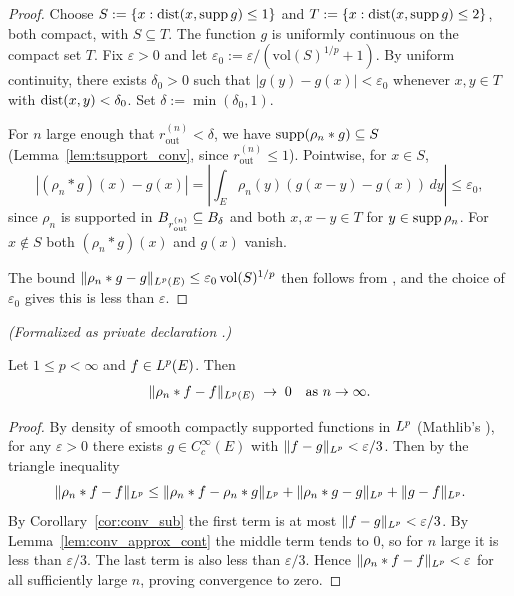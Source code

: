 \begin{proof}
\leanok
{}

Choose $S := \{x : \operatorname{dist}(x, \operatorname{supp} g) \le 1\}$ and $T := \{x : \operatorname{dist}(x, \operatorname{supp} g)
\le 2\}$, both compact, with $S \subseteq T$. The function $g$ is uniformly
continuous on the compact set $T$. Fix $\varepsilon > 0$ and let $\varepsilon_0
:= \varepsilon / (\mathrm{vol}(S)^{1/p} + 1)$. By uniform continuity, there
exists $\delta_0 > 0$ such that $|g(y) - g(x)| < \varepsilon_0$ whenever
$x, y \in T$ with $\operatorname{dist}(x, y) < \delta_0$. Set $\delta := \min(\delta_0, 1)$.

For $n$ large enough that $r_{\text{out}}^{(n)} < \delta$, we have $\operatorname{supp}(\rho_n
* g) \subseteq S$ (Lemma~\ref{lem:tsupport_conv}, since
$r_{\text{out}}^{(n)} \le 1$). Pointwise, for $x \in S$,
\begin{equation*}
  |(\rho_n * g)(x) - g(x)|
    = \left|\int_E \rho_n(y) (g(x - y) - g(x))\,dy\right|
    \le \varepsilon_0,
\end{equation*}
since $\rho_n$ is supported in $B_{r_{\text{out}}^{(n)}} \subseteq B_{\delta}$
and both $x, x - y \in T$ for $y \in \operatorname{supp}\rho_n$. For $x \notin S$ both
$(\rho_n * g)(x)$ and $g(x)$ vanish.

The bound $\|\rho_n * g - g\|_{L^{p}(E)} \le \varepsilon_0
\,\mathrm{vol}(S)^{1/p}$ then follows from
, and the choice of $\varepsilon_0$
gives this is less than $\varepsilon$.
\end{proof}

\begin{theorem}
\label{thm:conv_approx_Lp}
\leanok
\noindent\textit{(Formalized as private declaration .)}\par
Let $1 \le p < \infty$ and $f \in L^{p}(E)$. Then
\begin{equation*}
  \|\rho_n * f - f\|_{L^{p}(E)} \;\to\; 0 \quad\text{as } n \to \infty.
\end{equation*}
\end{theorem}

\begin{proof}
\leanok
{}

By density of smooth compactly supported functions in $L^{p}$ (Mathlib's
), for any $\varepsilon > 0$ there
exists $g \in C_c^\infty(E)$ with $\|f - g\|_{L^{p}} < \varepsilon/3$. Then by
the triangle inequality
\begin{equation*}
  \|\rho_n * f - f\|_{L^{p}} \le
  \|\rho_n * f - \rho_n * g\|_{L^{p}} + \|\rho_n * g - g\|_{L^{p}} +
  \|g - f\|_{L^{p}}.
\end{equation*}
By Corollary~\ref{cor:conv_sub} the first term is at most $\|f - g\|_{L^{p}} <
\varepsilon/3$. By Lemma~\ref{lem:conv_approx_cont} the middle term tends to
$0$, so for $n$ large it is less than $\varepsilon/3$. The last term is also
less than $\varepsilon/3$. Hence $\|\rho_n * f - f\|_{L^{p}} < \varepsilon$
for all sufficiently large $n$, proving convergence to zero.
\end{proof}

